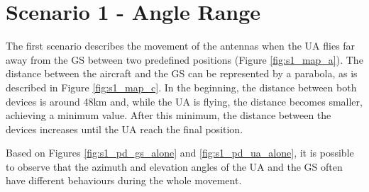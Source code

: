 \newpage
\section{Scenario 1 - Angle Range}\label{sec:scenario1}
The first scenario describes the movement of the antennas when the UA flies far away from the GS between two predefined positions (Figure \ref{fig:s1_map_a}). The distance between the aircraft and the GS can be represented by a parabola, as is described in Figure \ref{fig:s1_map_c}. In the beginning, the distance between both devices is around 48km and, while the UA is flying, the distance becomes smaller, achieving a minimum value. After this minimum, the distance between the devices increases until the UA reach the final position.

Based on Figures \ref{fig:s1_pd_gs_alone} and \ref{fig:s1_pd_ua_alone}, it is possible to observe that the azimuth and elevation angles of the UA and the GS often have different behaviours during the whole movement. 

